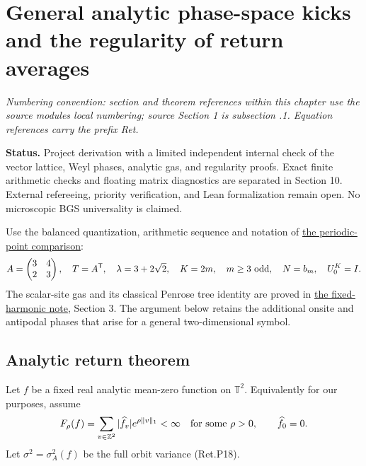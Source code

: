 \hypertarget{general-analytic-phase-space-kicks-and-the-regularity-of-return-averages}{%
\section{General analytic phase-space kicks and the regularity of return averages}\label{general-analytic-phase-space-kicks-and-the-regularity-of-return-averages}}
\par\smallskip\noindent\emph{Numbering convention: section and theorem references within this chapter use the source module\textquotesingle s local numbering; source Section 1 is subsection \thesection.1. Equation references carry the prefix Ret.}\par\smallskip

\textbf{Status.} Project derivation with a limited independent internal check
of the vector lattice, Weyl phases, analytic gas, and regularity proofs.
Exact finite arithmetic checks and floating matrix diagnostics are
separated in Section 10. External refereeing, priority verification,
and Lean formalization remain open. No microscopic BGS universality
is claimed.

Use the balanced quantization, arithmetic sequence and notation of
\href{https://github.com/ChurilovMaksim/BGS/blob/main/mathematics/periodic_point_trace_comparison.md}{the periodic-point comparison}:
\[
 A=\begin{pmatrix}3&4\\2&3\end{pmatrix},\quad T=A^{\mathsf T},
 \quad\lambda=3+2\sqrt2,\quad K=2m,\quad m\ge3\ {\rm odd},
 \quad N=b_m,\quad U_0^K=I .
\]
The scalar-site gas and its classical Penrose tree identity are proved in
\href{https://github.com/ChurilovMaksim/BGS/blob/main/mathematics/fixed_harmonic_return_gas.md}{the fixed-harmonic note}, Section 3.
The argument below retains the additional onsite and antipodal phases
that arise for a general two-dimensional symbol.

\hypertarget{analytic-return-theorem}{%
\subsection{Analytic return theorem}\label{analytic-return-theorem}}

Let \(f\) be a fixed real analytic mean-zero function on \(\mathbb T^2\).
Equivalently for our purposes, assume
\[
 F_\rho(f)=\sum_{v\in\mathbb Z^2}|\widehat f_v|e^{\rho\|v\|_1}
                                  <\infty
 \quad\hbox{for some }\rho>0,\qquad \widehat f_0=0.
\]
Let \(\sigma^2=\sigma_A^2(f)\) be the full orbit variance (Ret.P18).

